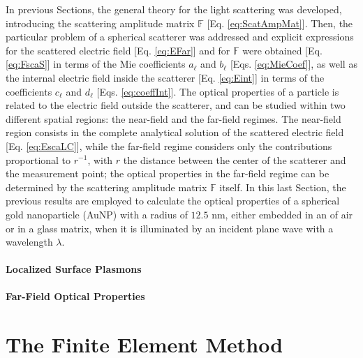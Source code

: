\documentclass[11pt]{Latex/Classes/PhDthesisPSnPDF}
\begin{document}
         In previous Sections, the general theory for the light scattering was developed, introducing the scattering amplitude matrix $\mathbb{F}$ [Eq. \eqref{eq:ScatAmpMat}]. Then, the particular problem of a spherical scatterer was addressed and explicit expressions for the scattered electric field [Eq. \eqref{eq:EFar}] and for $\mathbb{F}$ were obtained [Eq. \eqref{eq:FscaS}] in terms of the Mie coefficients $a_\ell$ and  $b_\ell$ [Eqs. \eqref{eq:MieCoef}], as well as the internal electric field inside the scatterer [Eq. \eqref{eq:Eint}] in terms of the coefficients $c_\ell$ and $d_\ell$ [Eqs. \eqref{eq:coeffInt}]. The  optical properties of a particle is related to the electric field outside the scatterer,  and can be studied within two different spatial regions: the near-field and the far-field regimes. The near-field region consists in the complete analytical solution of the scattered electric field [Eq. \eqref{eq:EscaLC}], while the far-field regime considers only the contributions proportional to $r^{-1}$, with $r$ the distance between the center of the scatterer and the measurement point; the optical properties in the far-field regime can be determined by the scattering amplitude matrix $\mathbb{F}$ itself.  In this last Section, the previous results are employed to calculate the optical properties of  a spherical gold nanoparticle (AuNP) with a radius of $12.5$ nm, either embedded in an of air or in a glass matrix, when it is illuminated by an incident plane wave with a wavelength $\lambda$.

            \subsubsection{Localized Surface Plasmons}
             \label{sss:LSPR}
             

            \subsubsection{Far-Field Optical Properties}
             \label{sss:FarField}
             


\chapter{The Finite Element Method}
 \label{chapter:FEM}
\end{document}
